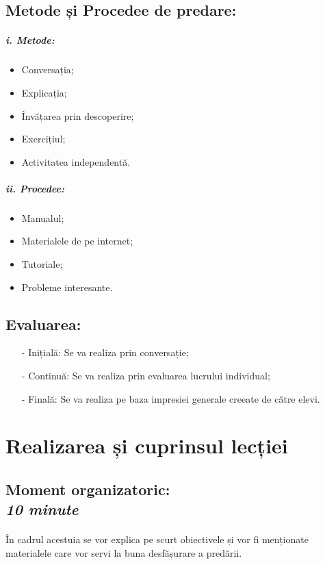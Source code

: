 \documentclass{article}
\newcommand{\itl}{\textit}
\begin{document}
	\subsection{Metode și Procedee de predare:}
	\begin{multicols}{2}
		\subparagraph{i. Metode:}
			\begin{itemize}[label={-}]
				\item Conversația;
				\item Explicația;
				\item Învățarea prin descoperire;
				\item Exercițiul;
				\item Activitatea independentă.
			\end{itemize}
		\columnbreak
		\subparagraph{ii. Procedee:}
			\begin{itemize}[label={-}]
				\item Manualul;
				\item Materialele de pe internet;
				\item Tutoriale;
				\item Probleme interesante.
				\item[]
			\end{itemize}
	\end{multicols}
	\subsection{Evaluarea:}
		\begin{itemize}
			\item[-] Inițială: Se va realiza prin conversație;
			\item[-] Continuă: Se va realiza prin evaluarea lucrului individual;
			\item[-] Finală: Se va realiza pe baza impresiei generale creeate de către elevi.
		\end{itemize}
		

\section{Realizarea și cuprinsul lecției}
	\subsection{Moment organizatoric:\\ \itl{10 minute}}
		\paragraph{}În cadrul acestuia se vor explica pe scurt obiectivele și vor fi menționate materialele care vor servi la buna desfășurare a predării.
		
\end{document}
